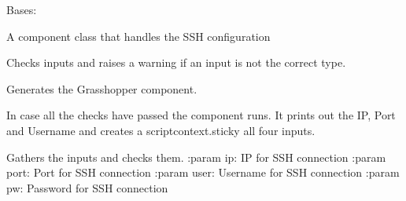 \documentclass[letterpaper,10pt,english]{sphinxmanual}
\begin{document}

\begin{fulllineitems}
\label{\detokenize{miscellaneous:livestock.components.misc.SSHConnection}}
Bases: {\hyperref[\detokenize{superclass:livestock.components.component.GHComponent}]{}}

A component class that handles the SSH configuration

\begin{fulllineitems}
\label{\detokenize{miscellaneous:livestock.components.misc.SSHConnection.check_inputs}}
Checks inputs and raises a warning if an input is not the correct type.

\end{fulllineitems}


\begin{fulllineitems}
\label{\detokenize{miscellaneous:livestock.components.misc.SSHConnection.config}}
Generates the Grasshopper component.

\end{fulllineitems}


\begin{fulllineitems}
\label{\detokenize{miscellaneous:livestock.components.misc.SSHConnection.run}}
In case all the checks have passed the component runs.
It prints out the IP, Port and Username and creates a
scriptcontext.sticky all four inputs.

\end{fulllineitems}


\begin{fulllineitems}
\label{\detokenize{miscellaneous:livestock.components.misc.SSHConnection.run_checks}}
Gathers the inputs and checks them.
:param ip: IP for SSH connection
:param port: Port for SSH connection
:param user: Username for SSH connection
:param pw: Password for SSH connection

\end{fulllineitems}


\end{fulllineitems}
\end{document}
